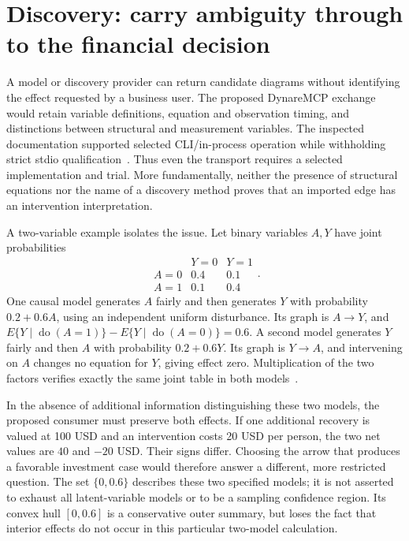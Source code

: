 \section{Discovery: carry ambiguity through to the financial decision}

A model or discovery provider can return candidate diagrams without
identifying the effect requested by a business user. The proposed
DynareMCP exchange would retain variable definitions, equation and observation
timing, and distinctions between structural and measurement variables. The
inspected documentation supported selected CLI/in-process operation while
withholding strict stdio qualification~\citep{v12_in_inventory}. Thus even the
transport requires a selected implementation and trial. More fundamentally,
neither the presence of structural equations nor the name of a discovery
method proves that an imported edge has an intervention interpretation.

A two-variable example isolates the issue. Let binary variables $A,Y$ have
joint probabilities
\[
 \begin{array}{c|cc}
       &Y=0&Y=1\\\hline
 A=0&0.4&0.1\\
 A=1&0.1&0.4
 \end{array}.
\]
One causal model generates $A$ fairly and then generates $Y$ with probability
$0.2+0.6A$, using an independent uniform disturbance. Its graph is
$A\to Y$, and $E\{Y\mid\operatorname{do}(A=1)\}-
E\{Y\mid\operatorname{do}(A=0)\}=0.6$. A second model generates $Y$
fairly and then $A$ with probability $0.2+0.6Y$. Its graph is $Y\to A$,
and intervening on $A$ changes no equation for $Y$, giving effect zero.
Multiplication of the two factors verifies exactly the same joint table
in both models~\citep{exec13_i3_examples}.

In the absence of additional information distinguishing these two models,
the proposed consumer must preserve both effects. If one additional recovery
is valued at 100 USD and an intervention costs 20 USD per person, the two
net values are $40$ and $-20$ USD. Their signs differ. Choosing the arrow
that produces a favorable investment case would therefore answer a different,
more restricted question. The set $\{0,0.6\}$ describes these two specified
models; it is not asserted to exhaust all latent-variable models or to be a
sampling confidence region. Its convex hull $[0,0.6]$ is a conservative
outer summary, but loses the fact that interior effects do not occur in this
particular two-model calculation.

